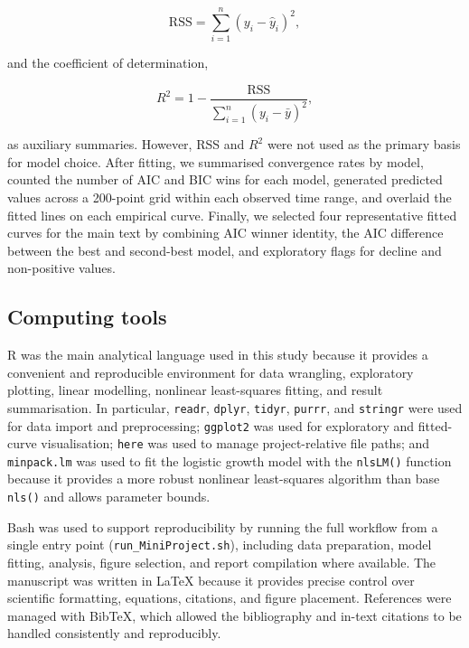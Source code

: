 \documentclass[11pt]{article}
\begin{document}
\begin{equation}
\mathrm{RSS} = \sum_{i=1}^{n}(y_i - \hat{y}_i)^2,
\label{eq:rss}
\end{equation}

and the coefficient of determination,

\begin{equation}
R^2 = 1 - \frac{\mathrm{RSS}}{\sum_{i=1}^{n}(y_i - \bar{y})^2},
\label{eq:r2}
\end{equation}

as auxiliary summaries. However, RSS and $R^2$ were not used as the primary basis for model choice. After fitting, we summarised convergence rates by model, counted the number of AIC and BIC wins for each model, generated predicted values across a 200-point grid within each observed time range, and overlaid the fitted lines on each empirical curve. Finally, we selected four representative fitted curves for the main text by combining AIC winner identity, the AIC difference between the best and second-best model, and exploratory flags for decline and non-positive values.

\subsection{Computing tools}

R was the main analytical language used in this study because it provides a convenient and reproducible environment for data wrangling, exploratory plotting, linear modelling, nonlinear least-squares fitting, and result summarisation. In particular, \texttt{readr}, \texttt{dplyr}, \texttt{tidyr}, \texttt{purrr}, and \texttt{stringr} were used for data import and preprocessing; \texttt{ggplot2} was used for exploratory and fitted-curve visualisation; \texttt{here} was used to manage project-relative file paths; and \texttt{minpack.lm} was used to fit the logistic growth model with the \texttt{nlsLM()} function because it provides a more robust nonlinear least-squares algorithm than base \texttt{nls()} and allows parameter bounds.

Bash was used to support reproducibility by running the full workflow from a single entry point (\texttt{run\_MiniProject.sh}), including data preparation, model fitting, analysis, figure selection, and report compilation where available. The manuscript was written in \LaTeX{} because it provides precise control over scientific formatting, equations, citations, and figure placement. References were managed with Bib\TeX{}, which allowed the bibliography and in-text citations to be handled consistently and reproducibly.
\end{document}
